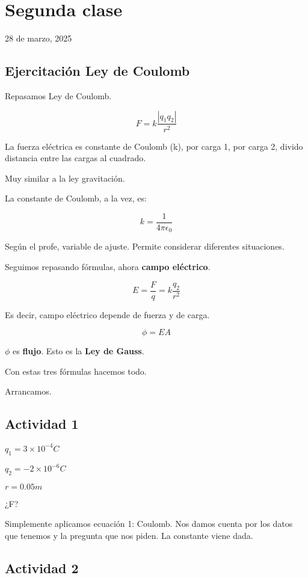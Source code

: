 \section{Segunda clase}

28 de marzo, 2025

\subsection{Ejercitación Ley de Coulomb}

Repasamos Ley de Coulomb.

\begin{equation*}
    F=k\frac{|q_1q_2|}{r^2}
\end{equation*}

La fuerza eléctrica es constante de Coulomb (k),
por carga 1,
por carga 2,
divido distancia entre las cargas al cuadrado.

Muy similar a la ley gravitación.

La constante de Coulomb,
a la vez, es:

\begin{equation*}
    k = \frac{1}{4\pi\epsilon_0}
\end{equation*}

Según el profe,
variable de ajuste.
Permite considerar diferentes situaciones.

Seguimos repasando fórmulas,
ahora \textbf{campo eléctrico}.

\begin{equation*}
    E=\frac{F}{q}=k\frac{q_2}{r^2}
\end{equation*}

Es decir, campo eléctrico depende de fuerza y de carga.

\begin{equation*}
    \phi=EA 
\end{equation*}

\(\phi\) es \textbf{flujo}.
Esto es la \textbf{Ley de Gauss}.

Con estas tres fórmulas hacemos todo.

Arrancamos.

\subsection{Actividad 1}

\(q_1=3\times10^{-4}C\)

\(q_2=-2\times10^{-6}C\)

\(r = 0.05m\)

¿F?

Simplemente aplicamos ecuación 1: Coulomb.
Nos damos cuenta por los datos que tenemos y la pregunta que nos piden.
La constante viene dada.

\subsection{Actividad 2}

